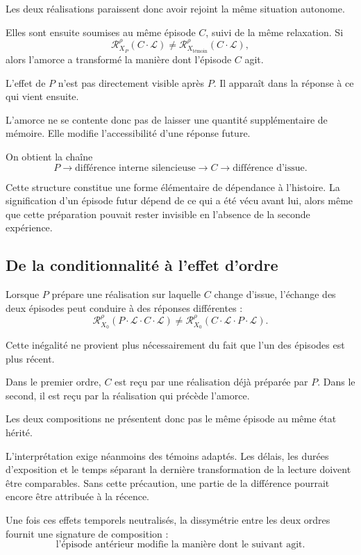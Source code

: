 Les deux réalisations paraissent donc avoir rejoint la même situation autonome.

Elles sont ensuite soumises au même épisode $C$, suivi de la même relaxation. Si
\[
\mathcal R_{X_P}^{\rho}(C\cdot\mathcal L)
\neq
\mathcal R_{X_{\text{t\'emoin}}}^{\rho}(C\cdot\mathcal L),
\]
alors l'amorce a transformé la manière dont l'épisode $C$ agit.

L'effet de $P$ n'est pas directement visible après $P$. Il apparaît dans la réponse à ce qui vient ensuite.

L'amorce ne se contente donc pas de laisser une quantité supplémentaire de mémoire. Elle modifie l'accessibilité d'une réponse future.

On obtient la chaîne
\[
P
\longrightarrow
\text{différence interne silencieuse}
\longrightarrow
C
\longrightarrow
\text{différence d'issue}.
\]

Cette structure constitue une forme élémentaire de dépendance à l'histoire. La signification d'un épisode futur dépend de ce qui a été vécu avant lui, alors même que cette préparation pouvait rester invisible en l'absence de la seconde expérience.

\subsection{De la conditionnalité à l'effet d'ordre}

Lorsque $P$ prépare une réalisation sur laquelle $C$ change d'issue, l'échange des deux épisodes peut conduire à des réponses différentes :
\[
\mathcal R_{X_0}^{\rho}
\left(
P\cdot\mathcal L\cdot C\cdot\mathcal L
\right)
\neq
\mathcal R_{X_0}^{\rho}
\left(
C\cdot\mathcal L\cdot P\cdot\mathcal L
\right).
\]

Cette inégalité ne provient plus nécessairement du fait que l'un des épisodes est plus récent.

Dans le premier ordre, $C$ est reçu par une réalisation déjà préparée par $P$. Dans le second, il est reçu par la réalisation qui précède l'amorce.

Les deux compositions ne présentent donc pas le même épisode au même état hérité.

L'interprétation exige néanmoins des témoins adaptés. Les délais, les durées d'exposition et le temps séparant la dernière transformation de la lecture doivent être comparables. Sans cette précaution, une partie de la différence pourrait encore être attribuée à la récence.

Une fois ces effets temporels neutralisés, la dissymétrie entre les deux ordres fournit une signature de composition :
\[
\text{l'épisode antérieur modifie la manière dont le suivant agit.}
\]

